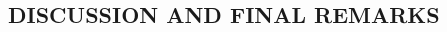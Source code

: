 \documentclass[10pt,a4paper]{article}
\begin{document}
\begin{multicols}{2}


\section{DISCUSSION AND FINAL REMARKS}


\end{multicols}
\end{document}
